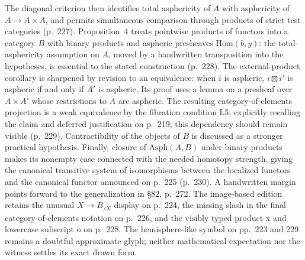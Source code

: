 The diagonal criterion then identifies total asphericity of $A$ with asphericity of $A\to A\times A$, and permits simultaneous comparison through products of strict test categories (p.\ 227). Proposition~4 treats pointwise products of functors into a category $B$ with binary products and aspheric presheaves $\underline{\mathrm{Hom}}(b,y)$: the total-asphericity assumption on $A$, moved by a handwritten transposition into the hypotheses, is essential to the stated construction (p.\ 228). The external-product corollary is sharpened by revision to an equivalence: when $i$ is aspheric, $i\boxtimes i'$ is aspheric if and only if $A'$ is aspheric. Its proof uses a lemma on a presheaf over $A\times A'$ whose restrictions to $A$ are aspheric. The resulting category-of-elements projection is a weak equivalence by the fibration condition L5, explicitly recalling the claim and deferred justification on p.\ 219; this dependency should remain visible (p.\ 229). Contractibility of the objects of $B$ is discussed as a stronger practical hypothesis. Finally, closure of $\mathrm{Asph}(A,B)$ under binary products makes its nonempty case connected with the needed homotopy strength, giving the canonical transitive system of isomorphisms between the localized functors and the canonical functor announced on p.\ 225 (p.\ 230). A handwritten margin points forward to the generalization in \S82, p.\ 272. The image-based edition retains the unusual $X\longrightarrow B_{/X}$ display on p.\ 224, the missing slash in the final category-of-elements notation on p.\ 226, and the visibly typed product x and lowercase subscript o on p.\ 228. The hemisphere-like symbol on pp.\ 223 and 229 remains a doubtful approximate glyph; neither mathematical expectation nor the witness settles its exact drawn form.

